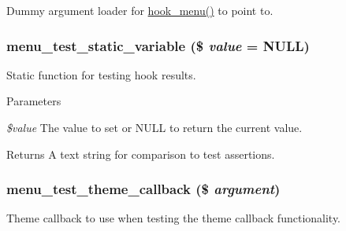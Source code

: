 \label{menu__test_8module_ae8d4a2e171ba77f8de35bd7570855741}
Dummy argument loader for \hyperlink{group__hooks_ga5c95244fea59b25666e409759e133ded}{hook\_\-menu()} to point to. \hypertarget{menu__test_8module_ac3620753f727728cc1802abc469ee491}{
\subsubsection[{menu\_\-test\_\-static\_\-variable}]{\setlength{\rightskip}{0pt plus 5cm}menu\_\-test\_\-static\_\-variable (\$ {\em value} = {\ttfamily NULL})}}
\label{menu__test_8module_ac3620753f727728cc1802abc469ee491}
Static function for testing hook results.


\begin{DoxyParams}{Parameters}
\item[{\em \$value}]The value to set or NULL to return the current value. \end{DoxyParams}
\begin{DoxyReturn}{Returns}
A text string for comparison to test assertions. 
\end{DoxyReturn}
\hypertarget{menu__test_8module_af198564d0866dc9912f71d6d3ccb90a3}{
\subsubsection[{menu\_\-test\_\-theme\_\-callback}]{\setlength{\rightskip}{0pt plus 5cm}menu\_\-test\_\-theme\_\-callback (\$ {\em argument})}}
\label{menu__test_8module_af198564d0866dc9912f71d6d3ccb90a3}
Theme callback to use when testing the theme callback functionality.


